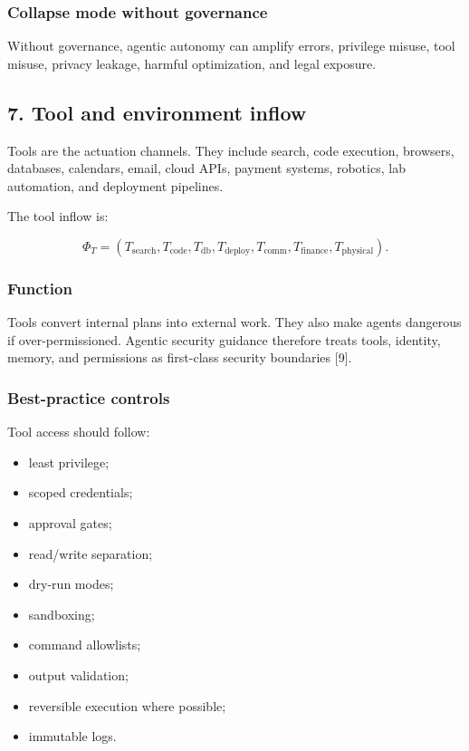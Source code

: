\subsubsection{Collapse mode without
governance}\label{collapse-mode-without-governance}

Without governance, agentic autonomy can amplify errors, privilege
misuse, tool misuse, privacy leakage, harmful optimization, and legal
exposure.

\subsection{7. Tool and environment
inflow}\label{tool-and-environment-inflow}

Tools are the actuation channels. They include search, code execution,
browsers, databases, calendars, email, cloud APIs, payment systems,
robotics, lab automation, and deployment pipelines.

The tool inflow is:

\[
\Phi_T=(T_{\text{search}},T_{\text{code}},T_{\text{db}},T_{\text{deploy}},T_{\text{comm}},T_{\text{finance}},T_{\text{physical}}).
\]

\subsubsection{Function}\label{function-6}

Tools convert internal plans into external work. They also make agents
dangerous if over-permissioned. Agentic security guidance therefore
treats tools, identity, memory, and permissions as first-class security
boundaries {[}9{]}.

\subsubsection{Best-practice controls}\label{best-practice-controls-5}

Tool access should follow:

\begin{itemize}
\tightlist
\item
  least privilege;
\item
  scoped credentials;
\item
  approval gates;
\item
  read/write separation;
\item
  dry-run modes;
\item
  sandboxing;
\item
  command allowlists;
\item
  output validation;
\item
  reversible execution where possible;
\item
  immutable logs.
\end{itemize}

